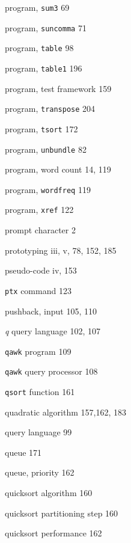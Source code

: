 \begin{multicols}{3}
\hangindent=3pc  program, \verb'sum3' 69



\hangindent=3pc  program, \verb'suncomma' 71

\hangindent=3pc  program, \verb'table' 98

\hangindent=3pc  program, \verb'table1' 196

\hangindent=3pc  program, test framework 159

\hangindent=3pc  program, \verb'transpose' 204

\hangindent=3pc  program, \verb'tsort' 172

\hangindent=3pc  program, \verb'unbundle' 82

\hangindent=3pc  program, word count 14, 119

\hangindent=3pc  program, \verb'wordfreq' 119

\hangindent=3pc  program, \verb'xref' 122

\hangindent=3pc  prompt character 2

\hangindent=3pc  prototyping iii, v, 78, 152, 185

\hangindent=3pc  pseudo-code iv, 153

\hangindent=3pc  \verb'ptx' command 123

\hangindent=3pc  pushback, input 105, 110

\hangindent=3pc  \textit{q} query language 102, 107

\hangindent=3pc  \verb'qawk' program 109

\hangindent=3pc  \verb'qawk' query processor 108

\hangindent=3pc  \verb'qsort' function 161

\hangindent=3pc  quadratic algorithm 157,162, 183

\hangindent=3pc  query language 99

\hangindent=3pc  queue 171

\hangindent=3pc  queue, priority 162

\hangindent=3pc  quicksort algorithm 160

\hangindent=3pc  quicksort partitioning step 160

\hangindent=3pc  quicksort performance 162


\end{multicols}
